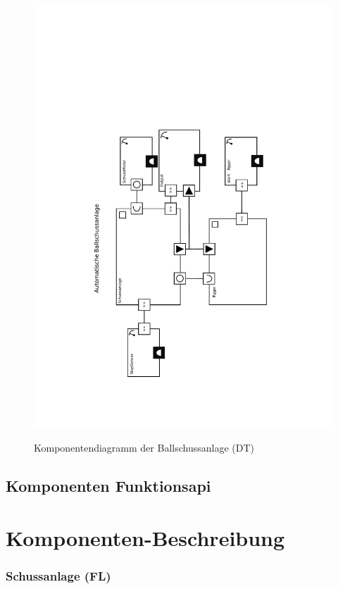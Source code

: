 \documentclass[a4paper,11pt]{scrreprt}
\begin{document}
\begin{figure}[htbp]
 \centering
 \includegraphics[scale=.75]{./KomponentenDiagramm.pdf}
 \label{fig:komponentendiag}
 \caption{Komponentendiagramm der Ballschussanlage (DT)}
\end{figure}

\section{Komponenten Funktionsapi}

\chapter{Komponenten-Beschreibung}

\subsection*{Schussanlage (FL)}
\end{document}
